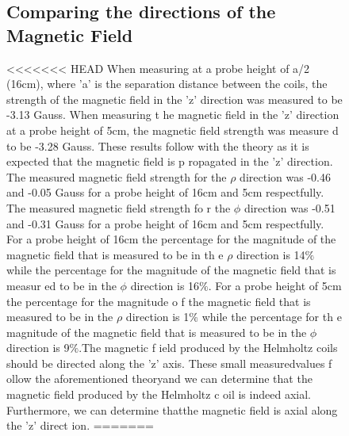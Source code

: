 \documentclass[a4paper]{article}
\begin{document}
\begin{figure}
\subsection{Comparing the directions of the Magnetic Field}
<<<<<<< HEAD
When measuring at a probe height of a/2 (16cm), where 'a' is the
separation distance between the coils, the strength of the magnetic
field in the 'z' direction was measured to be -3.13 Gauss. When
measuring t he magnetic field in the 'z' direction at a probe height
of 5cm, the magnetic field strength was measure d to be -3.28
Gauss. These results follow with the theory as it is expected that the
magnetic field is p ropagated in the 'z' direction. The measured
magnetic field strength for the $\rho$ direction was -0.46 and -0.05
Gauss for a probe height of 16cm and 5cm respectfully. The measured
magnetic field strength fo r the $\phi$ direction was -0.51 and -0.31
Gauss for a probe height of 16cm and 5cm respectfully. For a probe
height of 16cm the percentage for the magnitude of the magnetic field
that is measured to be in th e $\rho$ direction is 14$\%$ while the
percentage for the magnitude of the magnetic field that is measur ed
to be in the $\phi$ direction is 16$\%$. For a probe height of 5cm the
percentage for the magnitude o f the magnetic field that is measured
to be in the $\rho$ direction is 1$\%$ while the percentage for th e
magnitude of the magnetic field that is measured to be in the $\phi$
direction is 9$\%$.The magnetic f ield produced by the Helmholtz coils
should be directed along the 'z' axis. These small measuredvalues f
ollow the aforementioned theoryand we can determine that the magnetic
field produced by the Helmholtz c oil is indeed axial. Furthermore, we
can determine thatthe magnetic field is axial along the 'z' direct
ion.
=======


\end{figure}
\end{document}
